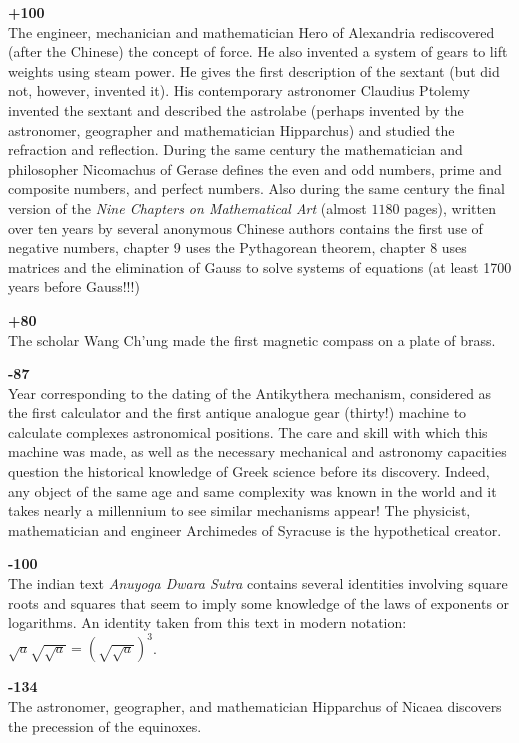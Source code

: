 \textbf{+100}\\
The engineer, mechanician and mathematician Hero of Alexandria rediscovered (after the Chinese) the concept of force. He also invented a system of gears to lift weights using steam power. He gives the first description of the sextant (but did not, however, invented it). His contemporary astronomer Claudius Ptolemy invented the sextant and described the astrolabe (perhaps invented by the astronomer, geographer and mathematician Hipparchus) and studied the refraction and reflection. During the same century the mathematician and philosopher Nicomachus of Gerase defines the even and odd numbers, prime and composite numbers, and perfect numbers. Also during the same century the final version of the \textit{Nine Chapters on Mathematical Art} (almost $1180$ pages), written over ten years by several anonymous Chinese authors contains the first use of negative numbers, chapter 9 uses the Pythagorean theorem, chapter 8 uses matrices and the elimination of Gauss to solve systems of equations (at least 1700 years before Gauss!!!)

\textbf{+80}\\
The scholar Wang Ch'ung made the first magnetic compass on a plate of brass.

\textbf{-87}\\
Year corresponding to the dating of the Antikythera mechanism, considered as the first calculator and the first antique analogue gear (thirty!) machine to calculate complexes astronomical positions. The care and skill with which this machine was made, as well as the necessary mechanical and astronomy capacities question the historical knowledge of Greek science before its discovery. Indeed, any object of the same age and same complexity was known in the world and it takes nearly a millennium to see similar mechanisms appear! The physicist, mathematician and engineer Archimedes of Syracuse is the hypothetical creator.

\textbf{-100}\\
The indian text \textit{Anuyoga Dwara Sutra} contains several identities involving square roots and squares that seem to imply some knowledge of the laws of exponents or logarithms. An identity taken from this text in modern notation: $\sqrt{a}\sqrt{\sqrt{a}}=(\sqrt{\sqrt{a}})^3$.

\textbf{-134}\\
The astronomer, geographer, and mathematician Hipparchus of Nicaea discovers the precession of the equinoxes.

